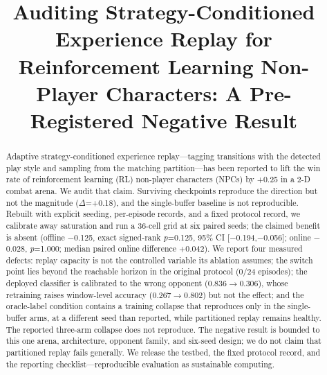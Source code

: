 \documentclass[conference,9pt]{IEEEtran}
\begin{document}
\title{Auditing Strategy-Conditioned Experience Replay for Reinforcement Learning Non-Player Characters: A Pre-Registered Negative Result}
\author{
\and
{}
\and
{}
}
\maketitle

\begin{abstract}
Adaptive strategy-conditioned experience replay---tagging transitions with the detected play style and sampling from the matching partition---has been reported to lift the win rate of reinforcement learning (RL) non-player characters (NPCs) by +0.25 in a 2-D combat arena. We audit that claim. Surviving checkpoints reproduce the direction but not the magnitude ($\Delta$=+0.18), and the single-buffer baseline is not reproducible. Rebuilt with explicit seeding, per-episode records, and a fixed protocol record, we calibrate away saturation and run a 36-cell grid at six paired seeds; the claimed benefit is absent (offline $-$0.125, exact signed-rank \textit{p}=0.125, 95\% CI [$-$0.194,$-$0.056]; online $-$0.028, \textit{p}=1.000; median paired online difference +0.042). We report four measured defects: replay capacity is not the controlled variable its ablation assumes; the switch point lies beyond the reachable horizon in the original protocol (0/24 episodes); the deployed classifier is calibrated to the wrong opponent (0.836$\rightarrow$0.306), whose retraining raises window-level accuracy (0.267$\rightarrow$0.802) but not the effect; and the oracle-label condition contains a training collapse that reproduces only in the single-buffer arms, at a different seed than reported, while partitioned replay remains healthy. The reported three-arm collapse does not reproduce. The negative result is bounded to this one arena, architecture, opponent family, and six-seed design; we do not claim that partitioned replay fails generally. We release the testbed, the fixed protocol record, and the reporting checklist---reproducible evaluation as sustainable computing.
\end{abstract}
\end{document}
